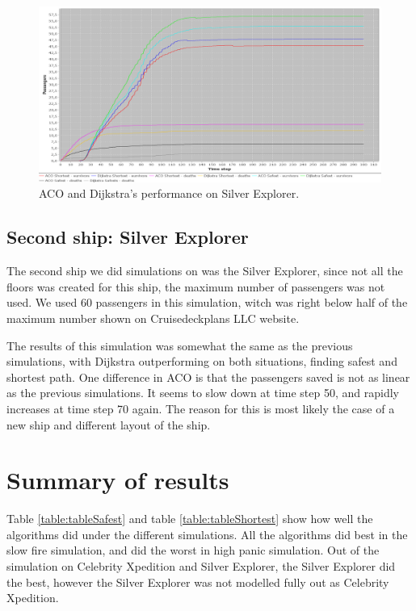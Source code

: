 \begin{figure} [h]
\centering
\hspace*{-1.0in}
\includegraphics[scale=0.35]{images/Graph-ship-two-60-passangers-200-rounds.png}
\caption{ACO and Dijkstra's performance on Silver Explorer.}
\label{fig:silverExplor}
\end{figure}

\subsection{Second ship: Silver Explorer}
The second ship we did simulations on was the Silver Explorer, since not all the floors was created for this ship, the maximum number of passengers was not used. We used 60 passengers in this simulation, witch was right below half of the maximum number shown on Cruisedeckplans LLC website\cite{cruseships}.

The results of this simulation was somewhat the same as the previous simulations, with Dijkstra outperforming on both situations, finding safest and shortest path. One difference in ACO is that the passengers saved is not as linear as the previous simulations. It seems to slow down at time step 50, and rapidly increases at time step 70 again. The reason for this is most likely the case of a new ship and different layout of the ship.

\section{Summary of results}

Table \ref{table:tableSafest} and table \ref{table:tableShortest} show how well the algorithms did under the different simulations. All the algorithms did best in the slow fire simulation, and did the worst in high panic simulation. Out of the simulation on Celebrity Xpedition and Silver Explorer, the Silver Explorer did the best, however the Silver Explorer was not modelled fully out as Celebrity Xpedition.

